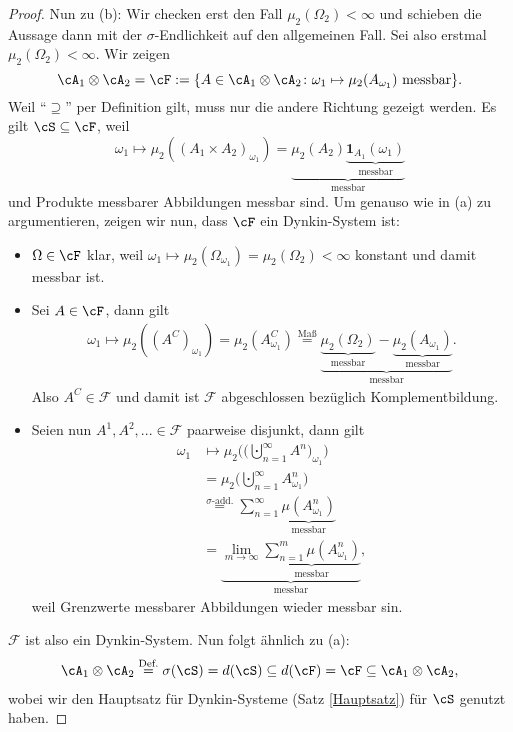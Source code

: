 \begin{proof}
	Nun zu (b): Wir checken erst den Fall $\mu_2(\Omega_2) < \infty$ und schieben die Aussage dann mit der $\sigma$-Endlichkeit auf den allgemeinen Fall. Sei also erstmal $\mu_2(\Omega_2) < \infty$. 
	 Wir zeigen $$\cA_1 \otimes \cA_2 = \cF := \{ A \in \cA_1 \otimes \cA_2\colon \omega_1 \mapsto \mu_2(A_{\omega_1}) \text{ messbar} \}.$$ Weil \enquote{$\supseteq$} per Definition gilt, muss nur die andere Richtung gezeigt werden. Es gilt $\cS \subseteq \cF$, weil \[ \omega_1\mapsto \mu_2((A_1 \times A_2)_{\omega_1}) = \underbrace{\mu_2(A_2) \underbrace{\mathbf{1}_{A_1}(\omega_1)}_{\text{messbar}}}_{\text{messbar}}\] und Produkte messbarer Abbildungen messbar sind. Um genauso wie in (a) zu argumentieren, zeigen wir nun, dass $\cF$ ein Dynkin-System ist:
		\begin{itemize}
			\item $\Omega \in \cF$ klar, weil $\omega_1 \mapsto \mu_2(\Omega_{\omega_1}) = \mu_2(\Omega_2)<\infty$ konstant und damit messbar ist.
			\item Sei $A \in \cF$, dann gilt 
			\begin{gather*}
			\omega_1 \mapsto \mu_2((A^C)_{\omega_1}) = \mu_2(A_{\omega_1}^C) \overset{\text{Maß}}{=} \underbrace{\underbrace{\mu_2(\Omega_2)}_{\text{messbar}}- \underbrace{\mu_2(A_{\omega_1})}_{\text{messbar}}}_{\text{messbar}}.
			\end{gather*}
	Also $A^C\in \mathcal F$ und damit ist $\mathcal F$ abgeschlossen bez\"uglich Komplementbildung.
			\item Seien nun $A^1, A^2,... \in \mathcal F$ paarweise disjunkt, dann gilt
			\begin{align*}
			\omega_1 &\mapsto \mu_2 \Big(\Big(\bigcupdot_{n=1}^{\infty} A^n\Big)_{\omega_1}\Big)\\
			& = \mu_2 \Big(\bigcupdot_{n=1}^{\infty} A^n_{\omega_1}\Big)\\ 
			&\overset{\text{$\sigma$-add.}}{=} \sum_{n=1}^{\infty} \underbrace{\mu(A^n_{\omega_1})}_{\text{messbar}}\\
			&= \underbrace{\lim\limits_{m \to \infty}\underbrace{\sum_{n=1}^{m} \mu(A^n_{\omega_1})}_{\text{messbar}}}_{\text{messbar}},
		\end{align*}
		weil Grenzwerte messbarer Abbildungen wieder messbar sin. 
	\end{itemize}	
	$\mathcal F$ ist also ein Dynkin-System. Nun folgt \"ahnlich zu (a):
		\begin{align*}	
			\cA_1 \otimes \cA_2 \overset{\text{Def.}}{=} \sigma(\cS) = d(\cS) \subseteq d(\cF) = \cF \subseteq \cA_1 \otimes \cA_2,
		\end{align*}
		wobei wir den Hauptsatz f\"ur Dynkin-Systeme (Satz \ref{Hauptsatz}) f\"ur $\cS$ genutzt haben. \smallskip
		

\end{proof}
